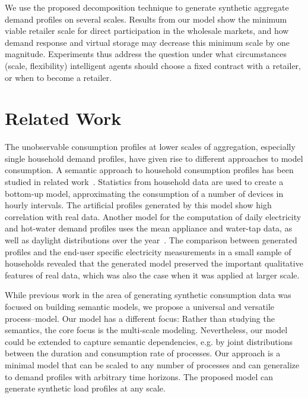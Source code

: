 \documentclass[conference]{IEEEtran}
\begin{document}
We use the proposed decomposition technique to generate synthetic aggregate demand profiles on several scales. Results from our model show the minimum viable retailer scale for direct participation in the wholesale markets, and how demand response and virtual storage may decrease this minimum scale by one magnitude. Experiments thus address the question under what circumstances (scale, flexibility) intelligent agents should choose a fixed contract with a retailer, or when to become a retailer.



\section{Related Work}
\label{sec:Related}
The unobservable consumption profiles at lower scales of aggregation, especially single household demand profiles, have given rise to different approaches to model consumption. A semantic approach to household consumption profiles has been studied in related work~\cite{paatero2006model}. Statistics from household data are used to create a bottom-up model, approximating the consumption of a number of devices in hourly intervals. The artificial profiles generated by this model show high correlation with real data.
Another model for the computation of daily electricity and hot-water demand profiles uses the mean appliance and water-tap data, as well as daylight distributions over the year~\cite{widen2009constructing}. The comparison between generated profiles and the end-user specific electricity measurements in a small sample of households revealed that the generated model preserved the important qualitative features of real data, which was also the case when it was applied at larger scale.

While previous work in the area of generating synthetic consumption data was focused on building semantic models, we propose a universal and versatile process--model. Our model has a different focus: Rather than studying the semantics, the core focus is the multi-scale modeling. Nevertheless, our model could be extended to capture semantic dependencies, e.g.  by joint distributions between the duration and consumption rate of processes. Our approach is a minimal model that can be scaled to any number of processes and can generalize to demand profiles with arbitrary time horizons. The proposed model can generate synthetic load profiles at any scale.
\end{document}
